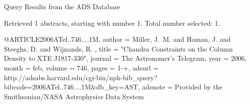 Query Results from the ADS Database


Retrieved 1 abstracts, starting with number 1.  Total number selected: 1.

@ARTICLE{2006ATel..746....1M,
   author = {{Miller}, J.~M. and {Homan}, J. and {Steeghs}, D. and {Wijnands}, R.
	},
    title = "{Chandra Constraints on the Column Density to XTE J1817-330}",
  journal = {The Astronomer's Telegram},
     year = 2006,
    month = feb,
   volume = 746,
    pages = {1-+},
   adsurl = {http://adsabs.harvard.edu/cgi-bin/nph-bib_query?bibcode=2006ATel..746....1M&db_key=AST},
  adsnote = {Provided by the Smithsonian/NASA Astrophysics Data System}
}


